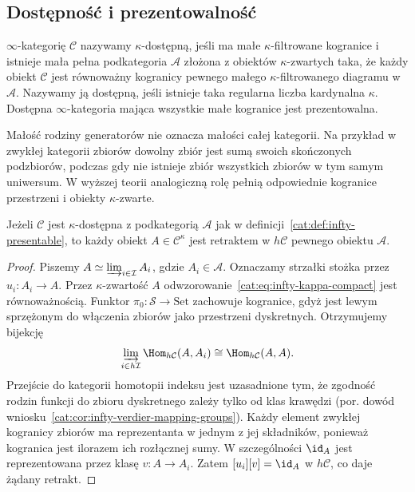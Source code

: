 \subsection{Dostępność i prezentowalność}

\begin{definicja}\label{cat:def:infty-presentable}
$\infty$-kategorię $\mathcal C$ nazywamy $\kappa$-dostępną, jeśli ma małe $\kappa$-filtrowane kogranice i istnieje mała pełna podkategoria $\mathcal A$ złożona z obiektów $\kappa$-zwartych taka, że każdy obiekt $\mathcal C$ jest równoważny kogranicy pewnego małego $\kappa$-filtrowanego diagramu w $\mathcal A$. Nazywamy ją dostępną, jeśli istnieje taka regularna liczba kardynalna $\kappa$. Dostępna $\infty$-kategoria mająca wszystkie małe kogranice jest prezentowalna.
\end{definicja}

Małość rodziny generatorów nie oznacza małości całej kategorii. Na przykład w zwykłej kategorii zbiorów dowolny zbiór jest sumą swoich skończonych podzbiorów, podczas gdy nie istnieje zbiór wszystkich zbiorów w tym samym uniwersum. W wyższej teorii analogiczną rolę pełnią odpowiednie kogranice przestrzeni i obiekty $\kappa$-zwarte.

\begin{stwierdzenie}\label{cat:prop:infty-accessible-compact-retract}
Jeżeli $\mathcal C$ jest $\kappa$-dostępna z podkategorią $\mathcal A$ jak w definicji~\ref{cat:def:infty-presentable}, to każdy obiekt $A\in\mathcal C^\kappa$ jest retraktem w $h\mathcal C$ pewnego obiektu $\mathcal A$.
\end{stwierdzenie}
\begin{proof}
Piszemy $A\simeq\varinjlim_{i\in\mathcal I}A_i$, gdzie $A_i\in\mathcal A$. Oznaczamy strzałki stożka przez $u_i:A_i\to A$. Przez $\kappa$-zwartość $A$ odwzorowanie~\eqref{cat:eq:infty-kappa-compact} jest równoważnością. Funktor $\pi_0:\mathcal S\to\mathrm{Set}$ zachowuje kogranice, gdyż jest lewym sprzężonym do włączenia zbiorów jako przestrzeni dyskretnych. Otrzymujemy bijekcję
\[
 \varinjlim_{i\in h\mathcal I}\Hom_{h\mathcal C}(A,A_i)
 \cong\Hom_{h\mathcal C}(A,A).
\]
Przejście do kategorii homotopii indeksu jest uzasadnione tym, że zgodność rodzin funkcji do zbioru dyskretnego zależy tylko od klas krawędzi (por. dowód wniosku~\ref{cat:cor:infty-verdier-mapping-groups}). Każdy element zwykłej kogranicy zbiorów ma reprezentanta w jednym z jej składników, ponieważ kogranica jest ilorazem ich rozłącznej sumy. W szczególności $\id_A$ jest reprezentowana przez klasę $v:A\to A_i$. Zatem $[u_i][v]=\id_A$ w $h\mathcal C$, co daje żądany retrakt.
\end{proof}

